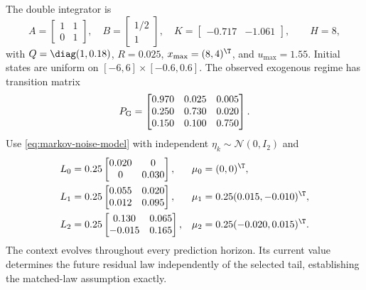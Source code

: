 The double integrator is
\begin{equation}
 A=\begin{bmatrix}1&1\\0&1\end{bmatrix},\quad
 B=\begin{bmatrix}1/2\\1\end{bmatrix},\quad
 K=\begin{bmatrix}-0.717&-1.061\end{bmatrix},\qquad H=8,
 \label{eq:benchA-system}
\end{equation}
with $Q=\diag(1,0.18)$, $R=0.025$, $x_{\max}=(8,4)^\T$, and $u_{\max}=1.55$. Initial states are uniform on $[-6,6]\times[-0.6,0.6]$. The observed exogenous regime has transition matrix
\begin{equation}
 P_{\rm G}=\begin{bmatrix}
 0.970&0.025&0.005\\0.250&0.730&0.020\\0.150&0.100&0.750
 \end{bmatrix}.
 \label{eq:numeric-A-transition}
\end{equation}
Use \eqref{eq:markov-noise-model} with independent $\eta_k\sim\mathcal N(0,I_2)$ and
\begin{align}
 L_0&=0.25\begin{bmatrix}0.020&0\\0&0.030\end{bmatrix},&\mu_0&=(0,0)^\T,\nonumber\\
 L_1&=0.25\begin{bmatrix}0.055&0.020\\0.012&0.095\end{bmatrix},&\mu_1&=0.25(0.015,-0.010)^\T,\label{eq:benchA-noise}\\
 L_2&=0.25\begin{bmatrix}0.130&0.065\\-0.015&0.165\end{bmatrix},&\mu_2&=0.25(-0.020,0.015)^\T.\nonumber
\end{align}
The context evolves throughout every prediction horizon. Its current value determines the future residual law independently of the selected tail, establishing the matched-law assumption exactly.

\begin{table}[tb]
\ifmarkchanges\color{blue}\else\color{black}\fi\centering\small
\setlength{\tabcolsep}{3pt}
\caption{Benchmark A: calibration and mission accounting, with $B_0=0.1$. Confidence is per context for scalar/scenario calibration and per absolute-coordinate margin for Bonferroni. Scalar shapes additionally use 1,800 independent design trajectories per context. The displayed spending and final balances hold in every main-run mission.}
\label{tab:calibration-budget}

\end{table}


